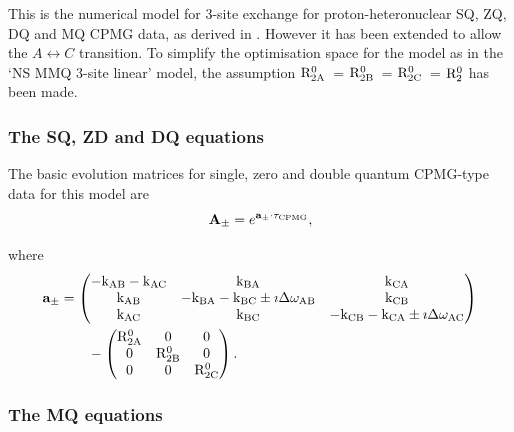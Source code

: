 This is the numerical model for 3-site exchange for proton-heteronuclear SQ, ZQ, DQ and MQ CPMG data, as derived in \citep{Korzhnev04a,Korzhnev04b,Korzhnev05}.
However it has been extended to allow the $A \leftrightarrow C$ transition.
To simplify the optimisation space for the model as in the `NS MMQ 3-site linear' model, the assumption $\mathrm{R}_\mathrm{2A}^0$~= $\mathrm{R}_\mathrm{2B}^0$~= $\mathrm{R}_\mathrm{2C}^0$~= $\mathrm{R}_2^0$ has been made.


\subsubsection{The SQ, ZD and DQ equations}

The basic evolution matrices for single, zero and double quantum CPMG-type data for this model are
\begin{equation}
    \mathbf{A_\pm} = e^{\mathbf{a_\pm} \cdot \tau_\textrm{CPMG}},
\end{equation}

where
\begin{align}
    \mathbf{a_\pm} &= \begin{pmatrix}
                        -\textrm{k}_\textrm{AB} -\textrm{k}_\textrm{AC} & \textrm{k}_\textrm{BA}                          & \textrm{k}_\textrm{CA} \\
                        \textrm{k}_\textrm{AB}        & -\textrm{k}_\textrm{BA} -\textrm{k}_\textrm{BC} \pm\imath\Delta\omega_\textrm{AB}    & \textrm{k}_\textrm{CB} \\
                        \textrm{k}_\textrm{AC}        & \textrm{k}_\textrm{BC}                          & -\textrm{k}_\textrm{CB} -\textrm{k}_\textrm{CA} \pm\imath\Delta\omega_\textrm{AC}
                      \end{pmatrix}  \nonumber \\
                   &\qquad - \begin{pmatrix}
                               \mathrm{R}_\mathrm{2A}^0 & 0          & 0    \\
                               0          & \mathrm{R}_\mathrm{2B}^0 & 0    \\
                               0          & 0          & \mathrm{R}_\mathrm{2C}^0
                             \end{pmatrix}.
\end{align}


\subsubsection{The MQ equations}


